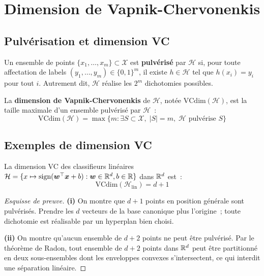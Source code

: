 \section{Dimension de Vapnik-Chervonenkis}
\label{sec:vc-dimension}

\subsection{Pulv\'erisation et dimension VC}

\begin{definition}
\label{def:shattering}
Un ensemble de points $\{x_1, \ldots, x_m\} \subset \mathcal{X}$ est
\textbf{pulv\'eris\'e} par $\mathcal{H}$ si, pour
toute affectation de labels $(y_1, \ldots, y_m) \in \{0, 1\}^m$, il
existe $h \in \mathcal{H}$ tel que $h(x_i) = y_i$ pour tout $i$.
Autrement dit, $\mathcal{H}$ r\'ealise les $2^m$ dichotomies possibles.
\end{definition}

\begin{definition}[Dimension VC]
\label{def:vc-dim}
La \textbf{dimension de Vapnik-Chervonenkis} de
$\mathcal{H}$, not\'ee $\text{VCdim}(\mathcal{H})$, est la taille
maximale d'un ensemble pulv\'eris\'e par $\mathcal{H}$~:
\begin{equation}
  \text{VCdim}(\mathcal{H}) = \max\{m : \exists S \subset \mathcal{X},\;
  |S| = m,\; \mathcal{H} \text{ pulv\'erise } S\}
\end{equation}
\end{definition}

\subsection{Exemples de dimension VC}

\begin{proposition}
\label{prop:vc-linear}
La dimension VC des classifieurs lin\'eaires
$\mathcal{H} = \{x \mapsto \text{sign}(\bm{w}^\top \bm{x} + b) :
\bm{w} \in \mathbb{R}^d, b \in \mathbb{R}\}$ dans $\mathbb{R}^d$ est~:
\begin{equation}
  \text{VCdim}(\mathcal{H}_{\text{lin}}) = d + 1
\end{equation}
\end{proposition}

\begin{proof}[Esquisse de preuve]
\textbf{(i)} On montre que $d+1$ points en position g\'en\'erale sont
pulv\'eris\'es. Prendre les $d$ vecteurs de la base canonique plus l'origine~;
toute dichotomie est r\'ealisable par un hyperplan bien choisi.

\textbf{(ii)} On montre qu'aucun ensemble de $d+2$ points ne peut \^etre
pulv\'eris\'e. Par le th\'eor\`eme de Radon, tout ensemble de $d+2$ points
dans $\mathbb{R}^d$ peut \^etre partitionn\'e en deux sous-ensembles dont les
enveloppes convexes s'intersectent, ce qui interdit une s\'eparation
lin\'eaire.
\end{proof}

